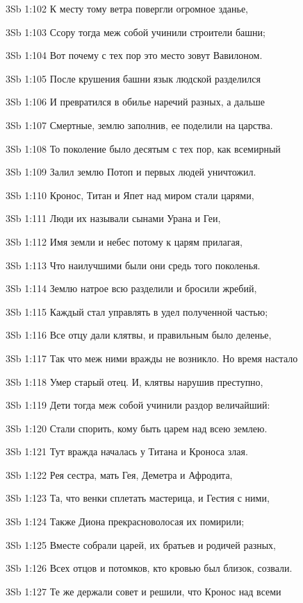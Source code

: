 \vs 3Sb 1:102 К месту тому  ветра повергли огромное зданье,

\vs 3Sb 1:103 Ссору тогда меж собой учинили строители башни; 

\vs 3Sb 1:104 Вот почему с тех пор это место зовут Вавилоном.

\vs 3Sb 1:105 После крушения башни язык людской разделился 

\vs 3Sb 1:106 И превратился в обилье наречий разных, а дальше 

\vs 3Sb 1:107 Смертные, землю заполнив, ее поделили на царства. 

\vs 3Sb 1:108 То поколение было десятым с тех пор, как всемирный 

\vs 3Sb 1:109 Залил землю Потоп и первых людей уничтожил.

\vs 3Sb 1:110 Кронос, Титан и Япет над миром стали царями, 

\vs 3Sb 1:111 Люди их называли сынами Урана и Геи, 

\vs 3Sb 1:112 Имя земли и небес потому к царям прилагая, 

\vs 3Sb 1:113 Что наилучшими были они средь того поколенья. 

\vs 3Sb 1:114 Землю натрое всю разделили и бросили жребий,

\vs 3Sb 1:115 Каждый стал управлять в удел полученной частью; 

\vs 3Sb 1:116 Все отцу дали клятвы, и правильным было деленье, 

\vs 3Sb 1:117 Так что меж ними вражды не возникло. Но время настало 

\vs 3Sb 1:118 Умер старый отец. И, клятвы нарушив преступно, 

\vs 3Sb 1:119 Дети тогда меж собой учинили раздор величайший:

\vs 3Sb 1:120 Стали спорить, кому быть царем над всею землею. 

\vs 3Sb 1:121 Тут вражда началась у Титана и Кроноса злая. 

\vs 3Sb 1:122 Рея  сестра, мать Гея, Деметра и Афродита, 

\vs 3Sb 1:123 Та, что венки сплетать мастерица, и Гестия с ними, 

\vs 3Sb 1:124 Также Диона прекрасноволосая их помирили;

\vs 3Sb 1:125 Вместе собрали царей, их братьев и родичей разных, 

\vs 3Sb 1:126 Всех отцов и потомков, кто кровью был близок, созвали. 

\vs 3Sb 1:127 Те же держали совет и решили, что Кронос над всеми 

